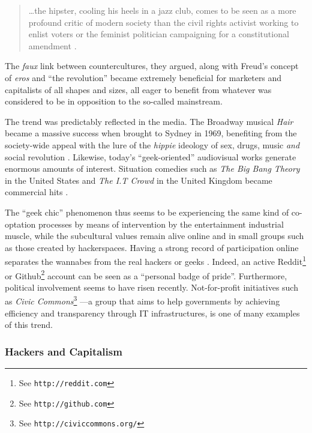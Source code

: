 \begin{quote}
\ldots the hipster, cooling his heels in a jazz club, comes to be seen as a more profound critic of modern society than the civil rights activist working to enlist voters or the feminist politician campaigning for a constitutional amendment \citep[p.32]{heath05}.
\end{quote}

The \textit{faux} link between countercultures, they argued, along with Freud's concept of \textit{eros} and ``the revolution'' became extremely beneficial for marketers and capitalists of all shapes and sizes, all eager to benefit from whatever was considered to be in opposition to the so-called mainstream.

The trend was predictably reflected in the media. The Broadway musical \textit{Hair} became a massive success when brought to Sydney in 1969, benefiting from the society-wide appeal with the lure of the \textit{hippie} ideology of sex, drugs, music \emph{and} social revolution \citep[p.104]{moore07}. Likewise, today's ``geek-oriented'' audiovisual works generate enormous amounts of interest. Situation comedies such as \textit{The Big Bang Theory} in the United States and \textit{The I.T Crowd} in the United Kingdom became commercial hits \citep{rodman09,smith06}.

The ``geek chic'' phenomenon thus seems to be experiencing the same kind of co-optation processes by means of intervention by the entertainment industrial muscle, while the subcultural values remain alive online and in small groups such as those created by hackerspaces. Having a strong record of participation online separates the wannabes from the real hackers or geeks \citep{tocci07}. Indeed, an active Reddit\footnote{See \texttt{http://reddit.com}} or Github\footnote{See \texttt{http://github.com}} account can be seen as a ``personal badge of pride''. Furthermore, political involvement seems to have risen recently. Not-for-profit initiatives such as \textit{Civic Commons}\footnote{See \texttt{http://civiccommons.org/}} ---a group that aims to help governments by achieving efficiency and transparency through IT infrastructures, is one of many examples of this trend.



\subsubsection{Hackers and Capitalism}


